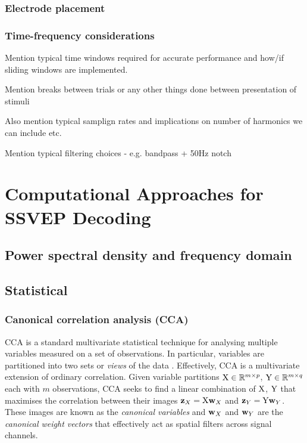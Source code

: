 \subsubsection{Electrode placement}

\subsubsection{Time-frequency considerations}
Mention typical time windows required for accurate performance and how/if sliding windows are implemented. 

Mention breaks between trials or any other things done between presentation of stimuli

Also mention typical samplign rates and implications on number of harmonics we can include etc. 

Mention typical filtering choices - e.g. bandpass + 50Hz notch

\section{Computational Approaches for SSVEP Decoding}
\subsection{Power spectral density and frequency domain}
\subsection{Statistical}

\subsubsection{Canonical correlation analysis (CCA)}
CCA is a standard multivariate statistical technique for analysing multiple variables measured on a set of observations. In particular, variables are partitioned into two sets or \textit{views} of the data \cite{cca-tutorial}. Effectively, CCA is a multivariate extension of ordinary correlation. Given variable partitions ${\textrm{X}} \in \mathbb{R}^{m\times p}$, ${\textrm{Y}} \in \mathbb{R}^{m\times q}$ each with $m$ observations, CCA seeks to find a linear combination of ${\textrm{X}}$, ${\textrm{Y}}$ that maximises the correlation between their images ${\mathbf{z}}_X = {\textrm{X}}{\mathbf{w}}_X$ and ${\mathbf{z}}_Y = {\textrm{Y}}{\mathbf{w}}_Y$. These images are known as the \textit{canonical variables} and ${\mathbf{w}}_X$ and ${\mathbf{w}}_Y$ are the \textit{canonical weight vectors} that effectively act as spatial filters across signal channels.

